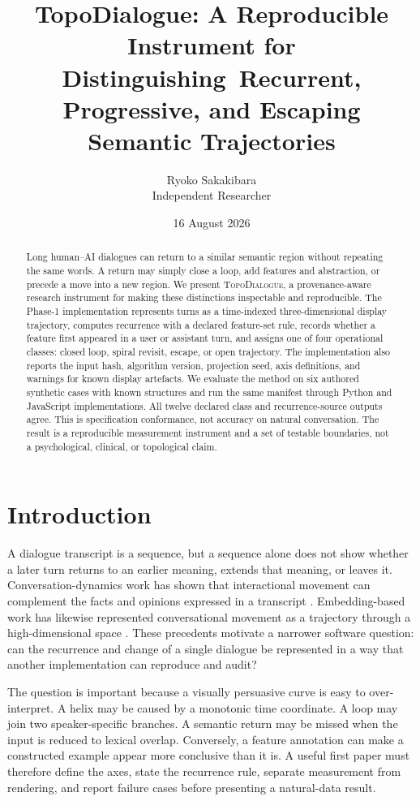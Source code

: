 \documentclass[11pt]{article}
\title{TopoDialogue: A Reproducible Instrument for Distinguishing\
Recurrent, Progressive, and Escaping Semantic Trajectories}
\author{Ryoko Sakakibara\\Independent Researcher}
\date{16 August 2026}
\newcommand{\system}{\textsc{TopoDialogue}}
\begin{document}
\maketitle

\begin{abstract}
Long human--AI dialogues can return to a similar semantic region without
repeating the same words. A return may simply close a loop, add features and
abstraction, or precede a move into a new region. We present \system{}, a
provenance-aware research instrument for making these distinctions inspectable
and reproducible. The Phase-1 implementation represents turns as a
time-indexed three-dimensional display trajectory, computes recurrence with a
declared feature-set rule, records whether a feature first appeared in a user
or assistant turn, and assigns one of four operational classes: closed loop,
spiral revisit, escape, or open trajectory. The implementation also reports
the input hash, algorithm version, projection seed, axis definitions, and
warnings for known display artefacts. We evaluate the method on six authored
synthetic cases with known structures and run the same manifest through Python
and JavaScript implementations. All twelve declared class and recurrence-source
outputs agree. This is specification conformance, not accuracy on natural
conversation. The result is a reproducible measurement instrument and a set of
testable boundaries, not a psychological, clinical, or topological claim.
\end{abstract}

\section{Introduction}

A dialogue transcript is a sequence, but a sequence alone does not show whether
a later turn returns to an earlier meaning, extends that meaning, or leaves it.
Conversation-dynamics work has shown that interactional movement can complement
the facts and opinions expressed in a transcript \citep{hua2024dynamics}.
Embedding-based work has likewise represented conversational movement as a
trajectory through a high-dimensional space \citep{fischer2024trajectories}.
These precedents motivate a narrower software question: can the recurrence and
change of a single dialogue be represented in a way that another implementation
can reproduce and audit?

The question is important because a visually persuasive curve is easy to
over-interpret. A helix may be caused by a monotonic time coordinate. A loop
may join two speaker-specific branches. A semantic return may be missed when
the input is reduced to lexical overlap. Conversely, a feature annotation can
make a constructed example appear more conclusive than it is. A useful first
paper must therefore define the axes, state the recurrence rule, separate
measurement from rendering, and report failure cases before presenting a
natural-data result.
\end{document}

